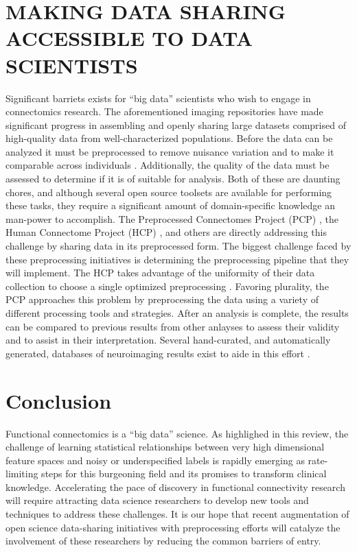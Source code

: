\section{MAKING DATA SHARING ACCESSIBLE TO DATA SCIENTISTS}

Significant barriets exists for ``big data'' scientists who wish to engage in connectomics research. The aforementioned imaging repositories have made significant progress in assembling and openly sharing large datasets comprised of high-quality data from well-characterized populations. Before the data can be analyzed it must be preprocessed to remove nuisance variation and to make it comparable across individuals \cite{strother2006}. Additionally, the quality of the data must be assessed to determine if it is of suitable for analysis. Both of these are daunting chores, and although several open source toolsets are available for performing these tasks, they require a significant amount of domain-specific knowledge an man-power to accomplish. The Preprocessed Connectomes Project (PCP) \cite{CraddockPCP}, the Human Connectome Project (HCP) \cite{RosenHCP2010,VanEssen2012}, and others are directly addressing this challenge by sharing data in its preprocessed form. The biggest challenge faced by these preprocessing initiatives is determining the preprocessing pipeline that they will implement. The HCP takes advantage of the uniformity of their data collection to choose a single optimized preprocessing \cite{Glasser2013}. Favoring plurality, the PCP approaches this problem by preprocessing the data using a variety of different processing tools and strategies. After an analysis is complete, the results can be compared to previous results from other anlayses to assess their validity and to assist in their interpretation. Several hand-curated, and automatically generated, databases of neuroimaging results exist to aide in this effort \cite{Fox2002, Yarkoni2011, Neurovault, Brainspell}.


\section {Conclusion}
Functional connectomics is a ``big data'' science. As highlighed in this review, the challenge of learning statistical relationships between very high dimensional feature spaces and noisy or underspecified labels is rapidly emerging as rate-limiting steps for this burgeoning field and its promises to transform clinical knowledge. Accelerating the pace of discovery in functional connectivity research will require attracting data science researchers to develop new tools and techniques to address these challenges. It is our hope that recent augmentation of open science data-sharing initiatives with preprocessing efforts will catalyze the involvement of these researchers by reducing the common barriers of entry. 




